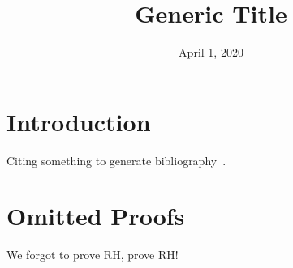 \documentclass[12pt]{default}
\title{Generic Title}
\date{April 1, 2020}
\begin{document}
\maketitle

\begin{abstract}
\end{abstract}

{}

\section{Introduction}
Citing something to generate bibliography~\autocite{MolinaLovettS19:optim_regul_expres_permut}.

% 

\printbibliography{}

\appendix

\section{Omitted Proofs}
% 
We forgot to prove RH\@, prove RH\@!
\end{document}
